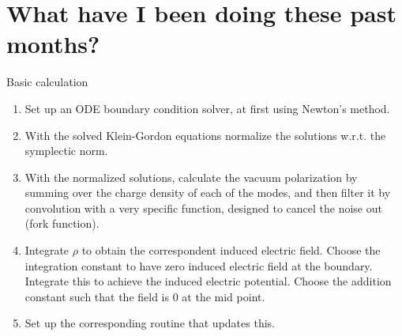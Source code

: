 \section{What have I been doing these past months?}

\begin{frame}[allowframebreaks]
	Basic calculation
\begin{enumerate}
	\item Set up an ODE boundary condition solver, at first using Newton's method.
	\item With the solved Klein-Gordon equations normalize the solutions w.r.t. the symplectic norm.
	\item With the normalized solutions, calculate the vacuum polarization by summing over the charge density of each of the modes, and then filter it by convolution with a very specific function, designed to cancel the noise out (fork function).
	\item Integrate $\rho$ to obtain the correspondent induced electric field. Choose the integration constant to have zero induced electric field at the boundary. Integrate this to achieve the induced electric potential. Choose the addition constant such that the field is 0 at the mid point.
	\item Set up the corresponding routine that updates this.
\end{enumerate}
\end{frame}


